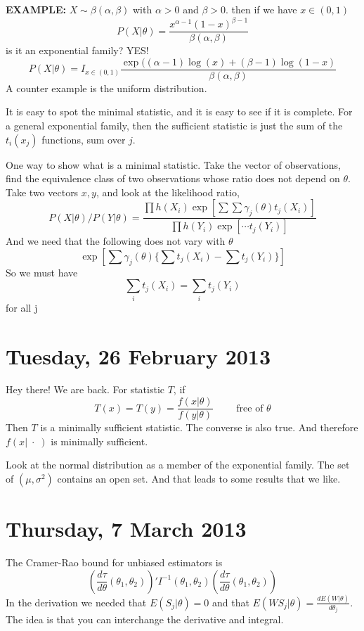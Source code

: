 \documentclass[letterpaper, 12pt]{article}
\theoremstyle{definition}
\theoremstyle{plain}
\begin{document}
\bigskip
\textbf{EXAMPLE: } $X \sim \beta(\alpha, \beta)$ with $\alpha > 0$ and $\beta > 0$. then if we have $x \in (0,1)$
\[
P( X | \theta) = \frac{x^{\alpha-1}(1-x)^{\beta -1}}{\beta (\alpha, \beta)}
\]
is it an exponential family? YES!
\[
P( X | \theta) = I_{x \in (0,1)} \frac{\exp( (\alpha - 1) \log (x) + (\beta - 1) \log(1-x )}{\beta(\alpha, \beta)}
\]
A counter example is the uniform distribution.

\bigskip
It is easy to spot the minimal statistic, and it is easy to see if it is complete. For a general exponential family, then the sufficient statistic is just the sum of the $t_i(x_j)$ functions, sum over $j$.

One way to show what is a minimal statistic. Take the vector of observations, find the equivalence class of two observations whose ratio does not depend on $\theta$. Take two vectors $x, y$, and look at the likelihood ratio,
\[
P( X | \theta) / P(Y | \theta) = \frac{ \prod h(X_i) \exp [ \sum \sum \gamma_j(\theta) t_j(X_i)]}{\prod h(Y_i)\exp[\cdots t_j(Y_i)]}
\]
And we need that the following does not vary with $\theta$
\[
\exp[\sum \gamma_j(\theta) \{\sum t_j(X_i) - \sum t_j(Y_i)\}]
\]
So we must have
\[
\sum_i t_j(X_i) = \sum_i t_j(Y_i)
\]
for all j

\section*{Tuesday, 26 February 2013}

Hey there! We are back. For statistic $T$, if 
\[
T(x) = T(y) = \frac{f(x| \theta)}{f(y | \theta)} 
\qquad
\text{ free of $\theta$}
\]
Then $T$ is a minimally sufficient statistic. The converse is also true. And therefore $f(x| \; \cdot \;)$ is minimally sufficient.

Look at the normal distribution as a member of the exponential family. The set of $(\mu, \sigma^2)$ contains an open set. And that leads to some results that we like.

\section*{Thursday, 7 March 2013}

The Cramer-Rao bound for unbiased estimators is 
\begin{equation}
\left(\frac{d \tau}{d \theta} (\theta_1, \theta_2)\right)' I ^{-1}(\theta_1, \theta_2)
\left(\frac{d \tau}{d \theta} (\theta_1, \theta_2)\right)
\end{equation}
In the derivation we needed that $E(S_j | \theta) = 0$ and that $E (W S_j | \theta) = \frac{d E(W | \theta)}{d \theta_j}$. The idea is that you can interchange the derivative and integral.
\end{document}
